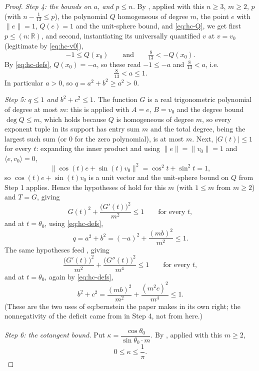 \begin{proof}
\emph{Step 4: the bounds on $a$, and $p\le n$.} By ,
applied with this $n\ge3$, $m\ge2$, $p$ (with $n-\tfrac1{13}\le p$), the
polynomial $Q$ homogeneous of degree $m$, the point $e$ with
$\lVert e\rVert=1$, $Q(e)=1$ and the unit-sphere bound, and
\eqref{eq:hc-Q}, we get first $p\le(n:\mathbb{R})$, and second, instantiating
its universally quantified $v$ at $v=v_0$ (legitimate by \eqref{eq:hc-v0}),
\[
  -1\le Q(x_0)
  \qquad\text{and}\qquad
  \tfrac8{13}<-Q(x_0).
\]
By \eqref{eq:hc-defs}, $Q(x_0)=-a$, so these read $-1\le-a$ and
$\tfrac8{13}<a$, i.e.
\begin{equation}\label{eq:hc-a}
  \tfrac8{13}<a\le1 .
\end{equation}
In particular $a>0$, so $q=a^2+b^2\ge a^2>0$.

\emph{Step 5: $q\le1$ and $b^2+c^2\le1$.} The function $G$ is a real
trigonometric polynomial of degree at most $m$: this is
 applied with $A=e$, $B=v_0$ and the degree bound
$\deg Q\le m$, which holds because $Q$ is homogeneous of degree $m$, so every
exponent tuple in its support has entry sum $m$ and the total degree, being the
largest such sum (or $0$ for the zero polynomial), is at most $m$. Next,
$\lvert G(t)\rvert\le1$ for every $t$: expanding the inner product and using
$\lVert e\rVert=\lVert v_0\rVert=1$ and $\langle e,v_0\rangle=0$,
\[
  \bigl\lVert\cos(t)e+\sin(t)v_0\bigr\rVert^2=\cos^2t+\sin^2t=1 ,
\]
so $\cos(t)e+\sin(t)v_0$ is a unit vector and the unit-sphere bound on $Q$ from
Step 1 applies. Hence the hypotheses of  hold for this
$m$ (with $1\le m$ from $m\ge2$) and $T=G$, giving
\[
  G(t)^2+\frac{\bigl(G'(t)\bigr)^2}{m^2}\le1\qquad\text{for every }t ,
\]
and at $t=\theta_0$, using \eqref{eq:hc-defs},
\begin{equation}\label{eq:hc-q1}
  q=a^2+b^2=(-a)^2+\frac{(mb)^2}{m^2}\le1 .
\end{equation}
The same hypotheses feed , giving
\[
  \frac{\bigl(G'(t)\bigr)^2}{m^2}+\frac{\bigl(G''(t)\bigr)^2}{m^4}\le1
  \qquad\text{for every }t ,
\]
and at $t=\theta_0$, again by \eqref{eq:hc-defs},
\begin{equation}\label{eq:hc-bc}
  b^2+c^2=\frac{(mb)^2}{m^2}+\frac{(m^2c)^2}{m^4}\le1 .
\end{equation}
(These are the two uses of eq:bernstein the paper makes in its own right; the
nonnegativity of the deficit came from  in Step 4, not
from here.)

\emph{Step 6: the cotangent bound.} Put
$\kappa=\dfrac{\cos\theta_0}{\sin\theta_0\cdot m}$. By ,
applied with this $m\ge2$,
\begin{equation}\label{eq:hc-kappa}
  0\le\kappa\le\frac1\pi .
\end{equation}


\end{proof}

